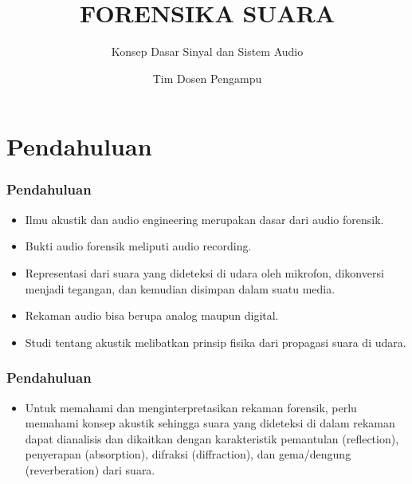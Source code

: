 \documentclass[pdflatex,compress]{beamer}
\title{FORENSIKA SUARA}
\subtitle{Konsep Dasar Sinyal dan Sistem Audio}
\author{Tim Dosen Pengampu}
\begin{document}
\maketitle

\section{Pendahuluan}

\begin{frame}
	\frametitle{Pendahuluan}
	\begin{itemize}
		\item Ilmu akustik dan audio engineering merupakan dasar dari audio forensik.
		\item Bukti audio forensik meliputi audio recording. \item Representasi dari suara yang dideteksi di udara oleh mikrofon, dikonversi menjadi tegangan, dan kemudian disimpan dalam suatu media.
		\item Rekaman audio bisa berupa analog maupun digital.
		\item Studi tentang akustik melibatkan prinsip fisika dari propagasi suara di udara.
	\end{itemize}
\end{frame}

\begin{frame}
	\frametitle{Pendahuluan}
	\begin{itemize}
		\item Untuk memahami dan menginterpretasikan rekaman forensik, perlu memahami konsep akustik sehingga suara yang dideteksi di dalam rekaman dapat dianalisis dan dikaitkan dengan karakteristik pemantulan (reflection), penyerapan (absorption), difraksi (diffraction), dan gema/dengung (reverberation) dari suara.
	\end{itemize}
\end{frame}
\end{document}

